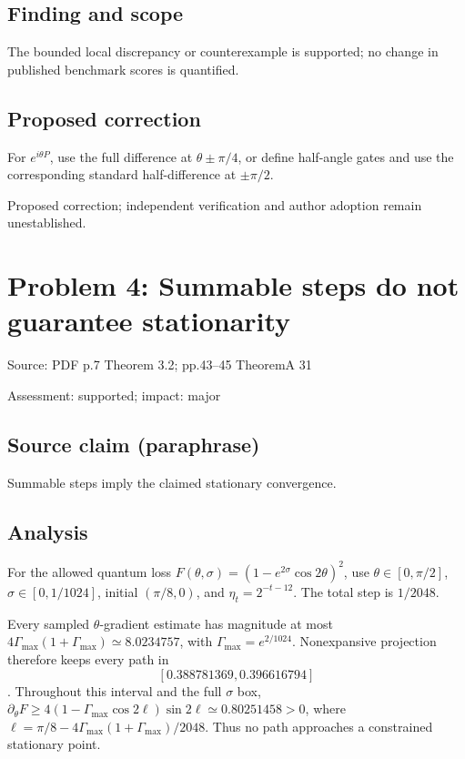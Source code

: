 \documentclass[11pt]{article}
\begin{document}
\subsection*{Finding and scope}

The bounded local discrepancy or counterexample is supported; no change in published benchmark scores is quantified.

\subsection*{Proposed correction}

For \(e^{i\theta P}\), use the full difference at \(\theta\pm\pi/4\), or define half-angle gates and use the corresponding standard half-difference at \(\pm\pi/2\).

Proposed correction; independent verification and author adoption remain unestablished.

\section*{Problem 4: Summable steps do not guarantee stationarity}

Source: PDF p.7 Theorem 3.2; pp.43–45 TheoremA 31

Assessment: supported; impact: major

\subsection*{Source claim (paraphrase)}

Summable steps imply the claimed stationary convergence.

\subsection*{Analysis}

For the allowed quantum loss \(F(\theta,\sigma)=(1-e^{2\sigma}\cos2\theta)^2\), use \(\theta\in[0,\pi/2]\), \(\sigma\in[0,1/1024]\), initial \((\pi/8,0)\), and \(\eta_t=2^{-t-12}\). The total step is \(1/2048\).

Every sampled \(\theta\)-gradient estimate has magnitude at most \(4\Gamma_{\max}(1+\Gamma_{\max})\simeq8.0234757\), with \(\Gamma_{\max}=e^{2/1024}\). Nonexpansive projection therefore keeps every path in \[[0.388781369,0.396616794]\]. Throughout this interval and the full \(\sigma\) box, \(\partial_\theta F\ge4(1-\Gamma_{\max}\cos2\ell)\sin2\ell\simeq0.80251458>0\), where \(\ell=\pi/8-4\Gamma_{\max}(1+\Gamma_{\max})/2048\). Thus no path approaches a constrained stationary point.
\end{document}
